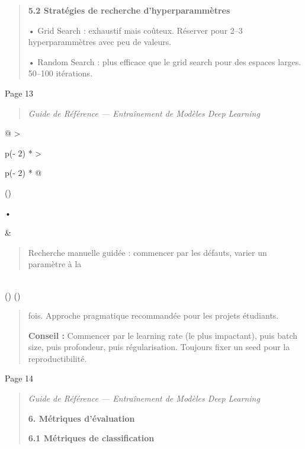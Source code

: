 \documentclass[
]{article}
\begin{document}
\begin{quote}
\textbf{5.2 Stratégies de recherche d'hyperparammètres}

• Grid Search : exhaustif mais coûteux. Réserver pour 2--3
hyperparammètres avec peu de valeurs.

• Random Search : plus efficace que le grid search pour des espaces
larges. 50--100 itérations.
\end{quote}

Page 13

\begin{quote}
\emph{Guide de Référence --- Entraînement de Modèles Deep Learning}
\end{quote}

\begin{longtable}[]{@{}
  >{\raggedright\arraybackslash}p{(\columnwidth - 2\tabcolsep) * }
  >{\raggedright\arraybackslash}p{(\columnwidth - 2\tabcolsep) * }@{}}
\toprule()
\begin{minipage}[b]{\linewidth}\raggedright
•
\end{minipage} & \begin{minipage}[b]{\linewidth}\raggedright
\begin{quote}
Recherche manuelle guidée : commencer par les défauts, varier un
paramètre à la
\end{quote}
\end{minipage} \\
\midrule()
\endhead
\bottomrule()
\end{longtable}

\begin{quote}
fois. Approche pragmatique recommandée pour les projets étudiants.

\textbf{Conseil :} Commencer par le learning rate (le plus impactant),
puis batch size, puis profondeur, puis régularisation. Toujours fixer un
seed pour la reproductibilité.
\end{quote}

Page 14

\begin{quote}
\emph{Guide de Référence --- Entraînement de Modèles Deep Learning}

\textbf{6. Métriques d'évaluation}

\textbf{6.1 Métriques de classification}
\end{quote}
\end{document}
